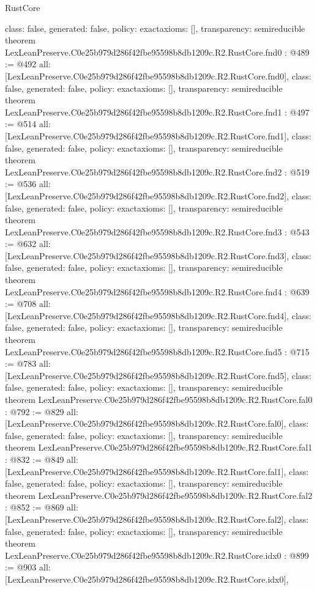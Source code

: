 \begin{lexlean}{RustCore}
\begin{coremodule}
{  class: false,
  generated: false,
  policy: exact{axioms: []},
  transparency: semireducible
}
theorem LexLeanPreserve.C0e25b979d286f42fbe95598b8db1209c.R2.RustCore.fnd0 : @489 := @492 {
  all: [LexLeanPreserve.C0e25b979d286f42fbe95598b8db1209c.R2.RustCore.fnd0],
  class: false,
  generated: false,
  policy: exact{axioms: []},
  transparency: semireducible
}
theorem LexLeanPreserve.C0e25b979d286f42fbe95598b8db1209c.R2.RustCore.fnd1 : @497 := @514 {
  all: [LexLeanPreserve.C0e25b979d286f42fbe95598b8db1209c.R2.RustCore.fnd1],
  class: false,
  generated: false,
  policy: exact{axioms: []},
  transparency: semireducible
}
theorem LexLeanPreserve.C0e25b979d286f42fbe95598b8db1209c.R2.RustCore.fnd2 : @519 := @536 {
  all: [LexLeanPreserve.C0e25b979d286f42fbe95598b8db1209c.R2.RustCore.fnd2],
  class: false,
  generated: false,
  policy: exact{axioms: []},
  transparency: semireducible
}
theorem LexLeanPreserve.C0e25b979d286f42fbe95598b8db1209c.R2.RustCore.fnd3 : @543 := @632 {
  all: [LexLeanPreserve.C0e25b979d286f42fbe95598b8db1209c.R2.RustCore.fnd3],
  class: false,
  generated: false,
  policy: exact{axioms: []},
  transparency: semireducible
}
theorem LexLeanPreserve.C0e25b979d286f42fbe95598b8db1209c.R2.RustCore.fnd4 : @639 := @708 {
  all: [LexLeanPreserve.C0e25b979d286f42fbe95598b8db1209c.R2.RustCore.fnd4],
  class: false,
  generated: false,
  policy: exact{axioms: []},
  transparency: semireducible
}
theorem LexLeanPreserve.C0e25b979d286f42fbe95598b8db1209c.R2.RustCore.fnd5 : @715 := @783 {
  all: [LexLeanPreserve.C0e25b979d286f42fbe95598b8db1209c.R2.RustCore.fnd5],
  class: false,
  generated: false,
  policy: exact{axioms: []},
  transparency: semireducible
}
theorem LexLeanPreserve.C0e25b979d286f42fbe95598b8db1209c.R2.RustCore.fal0 : @792 := @829 {
  all: [LexLeanPreserve.C0e25b979d286f42fbe95598b8db1209c.R2.RustCore.fal0],
  class: false,
  generated: false,
  policy: exact{axioms: []},
  transparency: semireducible
}
theorem LexLeanPreserve.C0e25b979d286f42fbe95598b8db1209c.R2.RustCore.fal1 : @832 := @849 {
  all: [LexLeanPreserve.C0e25b979d286f42fbe95598b8db1209c.R2.RustCore.fal1],
  class: false,
  generated: false,
  policy: exact{axioms: []},
  transparency: semireducible
}
theorem LexLeanPreserve.C0e25b979d286f42fbe95598b8db1209c.R2.RustCore.fal2 : @852 := @869 {
  all: [LexLeanPreserve.C0e25b979d286f42fbe95598b8db1209c.R2.RustCore.fal2],
  class: false,
  generated: false,
  policy: exact{axioms: []},
  transparency: semireducible
}
theorem LexLeanPreserve.C0e25b979d286f42fbe95598b8db1209c.R2.RustCore.idx0 : @899 := @903 {
  all: [LexLeanPreserve.C0e25b979d286f42fbe95598b8db1209c.R2.RustCore.idx0],
}
\end{coremodule}
\end{lexlean}
